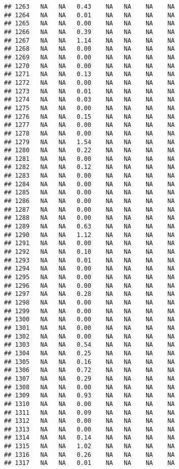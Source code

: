 \documentclass{article}\usepackage{graphicx, color}
\makeatletter
\newenvironment{kframe}{%
 \def\at@end@of@kframe{}%
 \ifinner\ifhmode%
  \def\at@end@of@kframe{\end{minipage}}%
  \begin{minipage}{\columnwidth}%
 \fi\fi%
 \def\FrameCommand##1{\hskip\@totalleftmargin \hskip-\fboxsep
 \colorbox{shadecolor}{##1}\hskip-\fboxsep
     \hskip-\linewidth \hskip-\@totalleftmargin \hskip\columnwidth}%
 \MakeFramed {\advance\hsize-\width
   \@totalleftmargin\z@ \linewidth\hsize
   \@setminipage}}%
 {\par\unskip\endMakeFramed%
 \at@end@of@kframe}
\newenvironment{knitrout}{}{} %
\makeatother
\begin{document}
\begin{knitrout}
\begin{kframe}
\begin{verbatim}
## 1263   NA   NA   0.43    NA   NA    NA    NA
## 1264   NA   NA   0.01    NA   NA    NA    NA
## 1265   NA   NA   0.00    NA   NA    NA    NA
## 1266   NA   NA   0.39    NA   NA    NA    NA
## 1267   NA   NA   1.14    NA   NA    NA    NA
## 1268   NA   NA   0.00    NA   NA    NA    NA
## 1269   NA   NA   0.00    NA   NA    NA    NA
## 1270   NA   NA   0.00    NA   NA    NA    NA
## 1271   NA   NA   0.13    NA   NA    NA    NA
## 1272   NA   NA   0.00    NA   NA    NA    NA
## 1273   NA   NA   0.01    NA   NA    NA    NA
## 1274   NA   NA   0.03    NA   NA    NA    NA
## 1275   NA   NA   0.00    NA   NA    NA    NA
## 1276   NA   NA   0.15    NA   NA    NA    NA
## 1277   NA   NA   0.00    NA   NA    NA    NA
## 1278   NA   NA   0.00    NA   NA    NA    NA
## 1279   NA   NA   1.54    NA   NA    NA    NA
## 1280   NA   NA   0.22    NA   NA    NA    NA
## 1281   NA   NA   0.00    NA   NA    NA    NA
## 1282   NA   NA   0.12    NA   NA    NA    NA
## 1283   NA   NA   0.00    NA   NA    NA    NA
## 1284   NA   NA   0.00    NA   NA    NA    NA
## 1285   NA   NA   0.00    NA   NA    NA    NA
## 1286   NA   NA   0.00    NA   NA    NA    NA
## 1287   NA   NA   0.00    NA   NA    NA    NA
## 1288   NA   NA   0.00    NA   NA    NA    NA
## 1289   NA   NA   0.63    NA   NA    NA    NA
## 1290   NA   NA   1.12    NA   NA    NA    NA
## 1291   NA   NA   0.00    NA   NA    NA    NA
## 1292   NA   NA   0.10    NA   NA    NA    NA
## 1293   NA   NA   0.01    NA   NA    NA    NA
## 1294   NA   NA   0.00    NA   NA    NA    NA
## 1295   NA   NA   0.00    NA   NA    NA    NA
## 1296   NA   NA   0.00    NA   NA    NA    NA
## 1297   NA   NA   0.28    NA   NA    NA    NA
## 1298   NA   NA   0.00    NA   NA    NA    NA
## 1299   NA   NA   0.00    NA   NA    NA    NA
## 1300   NA   NA   0.00    NA   NA    NA    NA
## 1301   NA   NA   0.00    NA   NA    NA    NA
## 1302   NA   NA   0.00    NA   NA    NA    NA
## 1303   NA   NA   0.54    NA   NA    NA    NA
## 1304   NA   NA   0.25    NA   NA    NA    NA
## 1305   NA   NA   0.16    NA   NA    NA    NA
## 1306   NA   NA   0.72    NA   NA    NA    NA
## 1307   NA   NA   0.29    NA   NA    NA    NA
## 1308   NA   NA   0.00    NA   NA    NA    NA
## 1309   NA   NA   0.93    NA   NA    NA    NA
## 1310   NA   NA   0.00    NA   NA    NA    NA
## 1311   NA   NA   0.09    NA   NA    NA    NA
## 1312   NA   NA   0.00    NA   NA    NA    NA
## 1313   NA   NA   0.00    NA   NA    NA    NA
## 1314   NA   NA   0.14    NA   NA    NA    NA
## 1315   NA   NA   1.02    NA   NA    NA    NA
## 1316   NA   NA   0.26    NA   NA    NA    NA
## 1317   NA   NA   0.01    NA   NA    NA    NA

\end{verbatim}
\end{kframe}
\end{knitrout}
\end{document}
